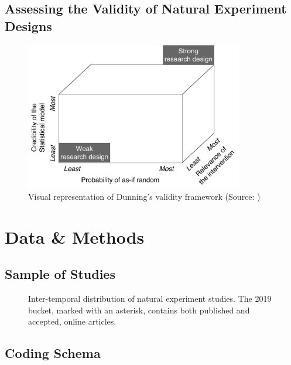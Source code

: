 \documentclass[nobib]{tufte-handout}
\begin{document}
\begin{refsection}
\subsection{Assessing the Validity of Natural Experiment Designs}
\label{sub:validity_framework}



\begin{figure}[]
    \centering
    \includegraphics[width=0.85\textwidth]{exhibits/validity_framework.pdf}
    \caption{Visual representation of Dunning's validity framework (Source:
    \parencite[][page 31]{Dunning2012})}
    \label{fig:validity_framework}
\end{figure}

\section{Data \& Methods}
\label{sec:article_selection}

\subsection{Sample of Studies}
\label{subsec:sample_of_studies}



\begin{figure}[]
    \centering
    
    \caption{Inter-temporal distribution of natural experiment studies.
    The 2019 bucket, marked with an asterisk, contains both published and 
    accepted, online articles.}
    \label{fig:studies_over_time}
\end{figure}

\subsection{Coding Schema}
\label{sub:coding_schema}


\end{refsection}
\end{document}

